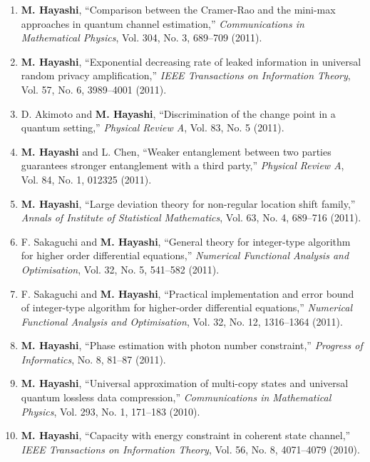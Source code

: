 \documentclass[a4paper,12pt,oneside]{article}
\begin{document}
\begin{enumerate}
\item \textbf{M. Hayashi}, 
``Comparison between the Cramer-Rao and the mini-max approaches in quantum channel estimation,'' 
{\em Communications in Mathematical Physics}, Vol. 304, No. 3, 689--709 (2011).

\item   \textbf{M. Hayashi}, 
``Exponential decreasing rate of leaked information in universal random privacy amplification,'' 
{\em IEEE Transactions on Information Theory}, Vol. 57, No. 6, 3989--4001 (2011).

\item   D. Akimoto and \textbf{M. Hayashi}, 
``Discrimination of the change point in a quantum setting,''
{\em Physical Review A}, Vol. 83, No. 5 (2011).

\item   \textbf{M. Hayashi} and L. Chen, 
``Weaker entanglement between two parties guarantees stronger entanglement with a third party,'' 
{\em Physical Review A}, Vol. 84, No. 1, 012325 (2011). 

\item   \textbf{M. Hayashi}, 
``Large deviation theory for non-regular location shift family,''
{\em Annals of Institute of Statistical Mathematics}, Vol. 63, No. 4, 689--716 (2011).

\item   F. Sakaguchi and \textbf{M. Hayashi}, 
``General theory for integer-type algorithm for higher order differential equations,'' 
{\em Numerical Functional Analysis and Optimisation}, 
Vol. 32, No. 5, 541--582 (2011).

\item   
F. Sakaguchi and \textbf{M. Hayashi}, 
``Practical implementation and error bound of integer-type algorithm for higher-order differential equations,'' 
{\em Numerical Functional Analysis and Optimisation}, 
Vol. 32, No. 12, 1316--1364 (2011). 

\item   \textbf{M. Hayashi}, 
``Phase estimation with photon number constraint,'' 
{\em Progress of Informatics}, No. 8, 81--87 (2011).

\item   \textbf{M. Hayashi}, 
``Universal approximation of multi-copy states and universal quantum lossless data compression,'' 
{\em Communications in Mathematical Physics}, Vol. 293, No. 1, 171--183 (2010). 

\item   \textbf{M. Hayashi}, 
``Capacity with energy constraint in coherent state channel,'' 
{\em IEEE Transactions on Information Theory}, Vol. 56, No. 8, 4071--4079 (2010).


\end{enumerate}
\end{document}
